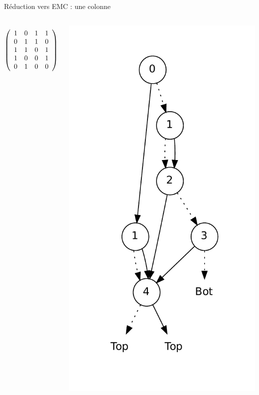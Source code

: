 \documentclass{beamer}
\begin{document}
\begin{frame}{Réduction vers EMC : une colonne}
  \begin{columns}

  \begin{displaymath}
   \left(\begin{array}{ c c c c c }
   1 & 0 & 1 & 1 \\
   0 & 1 & 1 & 0 \\
   1 & 1 & 0 & 1 \\
   1 & 0 & 0 & 1 \\
   0 & 1 & 0 & 0
  \end{array}\right)
  \end{displaymath}

    \includegraphics[height=0.9\textheight]{../imports/column.pdf}
  \end{columns}
\end{frame}
\end{document}
